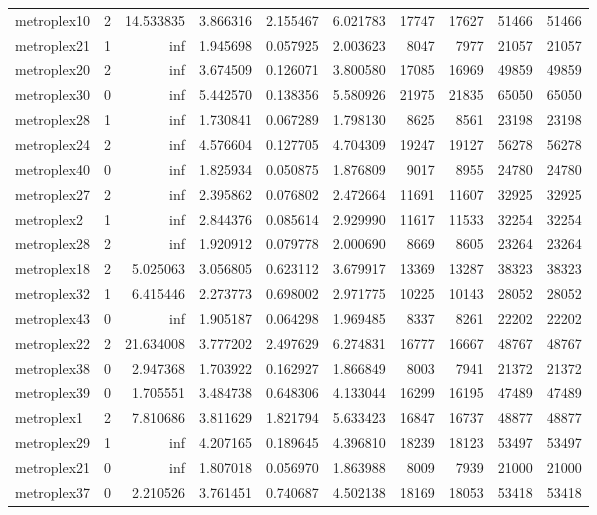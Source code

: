 \begin{longtable}{|l|r|r|r|r|r|r|r|r|r|}
metroplex10 & 2 & 14.533835 & 3.866316 & 2.155467 & 6.021783 & 17747 & 17627 & 51466 & 51466 \\
metroplex21 & 1 & inf & 1.945698 & 0.057925 & 2.003623 & 8047 & 7977 & 21057 & 21057 \\
metroplex20 & 2 & inf & 3.674509 & 0.126071 & 3.800580 & 17085 & 16969 & 49859 & 49859 \\
metroplex30 & 0 & inf & 5.442570 & 0.138356 & 5.580926 & 21975 & 21835 & 65050 & 65050 \\
metroplex28 & 1 & inf & 1.730841 & 0.067289 & 1.798130 & 8625 & 8561 & 23198 & 23198 \\
metroplex24 & 2 & inf & 4.576604 & 0.127705 & 4.704309 & 19247 & 19127 & 56278 & 56278 \\
metroplex40 & 0 & inf & 1.825934 & 0.050875 & 1.876809 & 9017 & 8955 & 24780 & 24780 \\
metroplex27 & 2 & inf & 2.395862 & 0.076802 & 2.472664 & 11691 & 11607 & 32925 & 32925 \\
metroplex2 & 1 & inf & 2.844376 & 0.085614 & 2.929990 & 11617 & 11533 & 32254 & 32254 \\
metroplex28 & 2 & inf & 1.920912 & 0.079778 & 2.000690 & 8669 & 8605 & 23264 & 23264 \\
metroplex18 & 2 & 5.025063 & 3.056805 & 0.623112 & 3.679917 & 13369 & 13287 & 38323 & 38323 \\
metroplex32 & 1 & 6.415446 & 2.273773 & 0.698002 & 2.971775 & 10225 & 10143 & 28052 & 28052 \\
metroplex43 & 0 & inf & 1.905187 & 0.064298 & 1.969485 & 8337 & 8261 & 22202 & 22202 \\
metroplex22 & 2 & 21.634008 & 3.777202 & 2.497629 & 6.274831 & 16777 & 16667 & 48767 & 48767 \\
metroplex38 & 0 & 2.947368 & 1.703922 & 0.162927 & 1.866849 & 8003 & 7941 & 21372 & 21372 \\
metroplex39 & 0 & 1.705551 & 3.484738 & 0.648306 & 4.133044 & 16299 & 16195 & 47489 & 47489 \\
metroplex1 & 2 & 7.810686 & 3.811629 & 1.821794 & 5.633423 & 16847 & 16737 & 48877 & 48877 \\
metroplex29 & 1 & inf & 4.207165 & 0.189645 & 4.396810 & 18239 & 18123 & 53497 & 53497 \\
metroplex21 & 0 & inf & 1.807018 & 0.056970 & 1.863988 & 8009 & 7939 & 21000 & 21000 \\
metroplex37 & 0 & 2.210526 & 3.761451 & 0.740687 & 4.502138 & 18169 & 18053 & 53418 & 53418 \\

\end{longtable}
